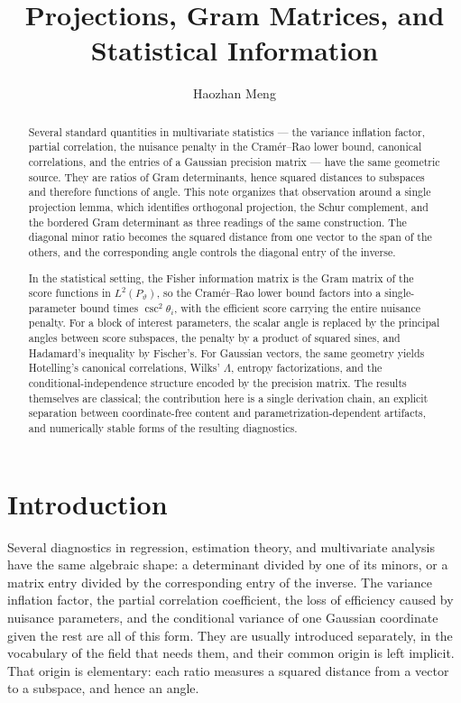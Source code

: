 \documentclass{IEEEtran}
\title{Projections, Gram Matrices, and Statistical Information}
\author{Haozhan Meng}
\begin{document}
\maketitle

\begin{abstract}
  Several standard quantities in multivariate statistics --- the variance inflation factor, partial correlation, the nuisance penalty in the Cram\'er--Rao lower bound, canonical correlations, and the entries of a Gaussian precision matrix --- have the same geometric source. They are ratios of Gram determinants, hence squared distances to subspaces and therefore functions of angle. This note organizes that observation around a single projection lemma, which identifies orthogonal projection, the Schur complement, and the bordered Gram determinant as three readings of the same construction. The diagonal minor ratio becomes the squared distance from one vector to the span of the others, and the corresponding angle controls the diagonal entry of the inverse.

  In the statistical setting, the Fisher information matrix is the Gram matrix of the score functions in $L^{2}(P_{\vartheta})$, so the Cram\'er--Rao lower bound factors into a single-parameter bound times $\csc^{2}\theta_{i}$, with the efficient score carrying the entire nuisance penalty. For a block of interest parameters, the scalar angle is replaced by the principal angles between score subspaces, the penalty by a product of squared sines, and Hadamard's inequality by Fischer's. For Gaussian vectors, the same geometry yields Hotelling's canonical correlations, Wilks' $\Lambda$, entropy factorizations, and the conditional-independence structure encoded by the precision matrix. The results themselves are classical; the contribution here is a single derivation chain, an explicit separation between coordinate-free content and parametrization-dependent artifacts, and numerically stable forms of the resulting diagnostics.
\end{abstract}

\section{Introduction}\label{sec:intro}

Several diagnostics in regression, estimation theory, and multivariate analysis have the same algebraic shape: a determinant divided by one of its minors, or a matrix entry divided by the corresponding entry of the inverse. The variance inflation factor, the partial correlation coefficient, the loss of efficiency caused by nuisance parameters, and the conditional variance of one Gaussian coordinate given the rest are all of this form. They are usually introduced separately, in the vocabulary of the field that needs them, and their common origin is left implicit. That origin is elementary: each ratio measures a squared distance from a vector to a subspace, and hence an angle.
\end{document}
